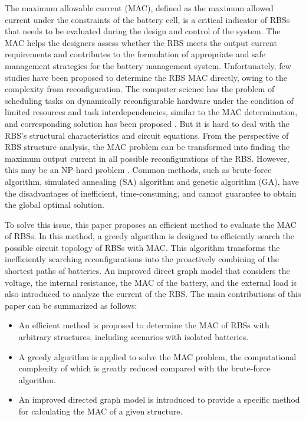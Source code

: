 \documentclass{article}
\begin{document}
The maximum allowable current (MAC), defined as the maximum allowed current under the constraints of the battery cell, is a critical indicator of RBSs that needs to be evaluated during the design and control of the system. 
The MAC helps the designers assess whether the RBS meets the output current requirements and contributes to the formulation of appropriate and safe management strategies for the battery management system. 
Unfortunately, few studies have been proposed to determine the RBS MAC directly, owing to the complexity from reconfiguration. 
The computer science has the problem of scheduling tasks on dynamically reconfigurable hardware under the condition of limited resources and task interdependencies, similar to the MAC determination, and corresponding solution has been proposed \cite{mollajafariEfficientLightweightAlgorithm2023,heReconfigurationassistedChargingLargescale2014}.
But it is hard to deal with the RBS's structural characteristics and circuit equations. 
From the perspective of RBS structure analysis, the MAC problem can be transformed into finding the maximum output current in all possible reconfigurations of the RBS. 
However, this may be an NP-hard problem \cite{pinterReviewControlAlgorithms2021a}. 
Common methods, such as brute-force algorithm, simulated annealing (SA) algorithm and genetic algorithm (GA), have the disadvantages of inefficient, time-consuming, and cannot guarantee to obtain the global optimal solution.


To solve this issue, this paper proposes an efficient method to evaluate the MAC of RBSs. 
In this method, a greedy algorithm is designed to efficiently search the possible circuit topology of RBSs with MAC.
This algorithm transforms the inefficiently searching reconfigurations into the proactively combining of the shortest paths of batteries.
An improved direct graph model that considers the voltage, the internal resistance, the MAC of the battery, and the external load is also introduced to analyze the current of the RBS.
The main contributions of this paper can be summarized as follows:
\begin{itemize}
  \item An efficient method is proposed to determine the MAC of RBSs with arbitrary structures, including scenarios with isolated batteries.
  \item A greedy algorithm is applied to solve the MAC problem, the computational complexity of which is greatly reduced compared with the brute-force algorithm.
  \item An improved directed graph model is introduced to provide a specific method for calculating the MAC of a given structure.
\end{itemize}
\end{document}

